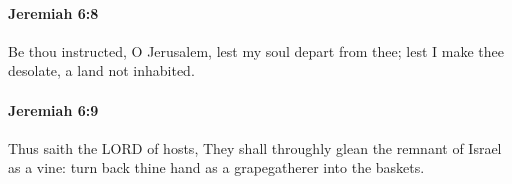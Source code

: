 		\paragraph{Jeremiah 6:8} %
			\label{JEREMIAH-6-8}

			Be thou instructed, O Jerusalem, lest my soul depart from thee; lest I make thee desolate, a land not inhabited.


		\paragraph{Jeremiah 6:9} %
			\label{JEREMIAH-6-9}

			Thus saith the LORD of hosts, They shall throughly glean the remnant of Israel as a vine: turn back thine hand as a grapegatherer into the baskets.


